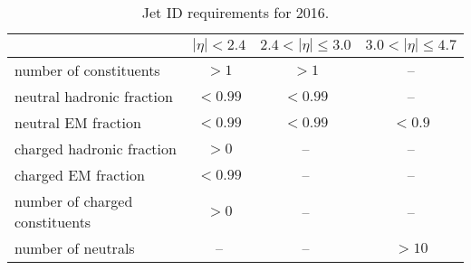 \begin{table}[ht]
    \centering
    \setlength{\tabcolsep}{0.8em}
    \renewcommand{\arraystretch}{1.25}
    \caption{Jet ID requirements for 2016.}
    \label{tab:slt:jet_id_2016}
    \begin{tabular}{l|ccc}
        \hline
                                    & $|\eta| < 2.4$ & $2.4 < |\eta| \leq 3.0$ & $3.0 < |\eta| \leq 4.7$ \\
        \hline                                                                   
        number of constituents         & $> 1$          & $> 1$                  & -- \\
        neutral hadronic fraction      & $< 0.99$       & $< 0.99$               & -- \\
        neutral EM fraction            & $< 0.99$       & $< 0.99$               & $<0.9$ \\
        charged hadronic fraction      & $> 0$          & --                     & -- \\
        charged EM fraction            & $< 0.99$       & --                     & -- \\
        number of charged constituents & $> 0$          & --                     & -- \\
        number of neutrals             & --             & --                     & $>10$                   \\
        \hline
    \end{tabular}
\end{table}